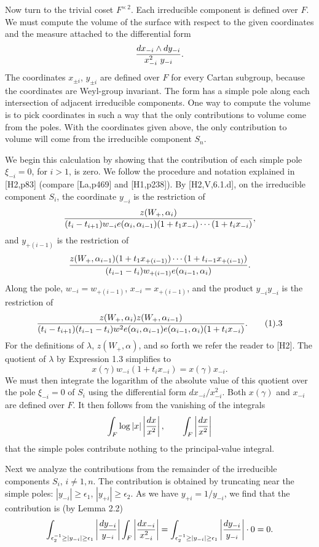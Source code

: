 Now turn to the trivial coset $F^{\times\,2}$.  Each
irreducible component is defined over $F$.
We must compute the volume of the surface with respect to
the given coordinates and the measure attached to the differential form
$${d x_{-i} \wedge dy_{-i}\over x_{-i}^2 \,\,y_{-i}}.$$
The coordinates $x_{\pm i}$, $y_{\pm i}$
are defined over $F$
for every Cartan subgroup, because the 
coordinates are Weyl-group invariant.
The form has a simple pole along each intersection of adjacent
irreducible components. 
One way to compute
the volume is to pick coordinates in such a way that the
only contributions to volume come from the poles.  With
the coordinates given above, the only contribution to
volume will come from the irreducible component $S_n$.

We begin this calculation by showing that the contribution
of each simple pole $\xi_{-i}=0$, for $i>1$,  is zero.  We follow
the procedure and notation explained in [H2,p83] (compare
[La,p469] and [H1,p238]).  
By [H2,V,6.1.d], on the irreducible component $S_i$,
the coordinate
$y_{-i}$ is the restriction of
$${z(W_+,\alpha_i)\over (t_i-t_{i+1}) w_{-i} e(\alpha_i,\alpha_{i-1})(1+t_1 x_{-i})
\cdots (1+t_i x_{-i} )},$$
and $y_{+(i-1)}$ is the restriction of
$${z(W_+,\alpha_{i-1}) (1+t_1 x_{+(i-1)})\cdots (1+t_{i-1} x_{+(i-1)})\over
(t_{i-1}-t_i) w_{+(i-1)} e(\alpha_{i-1},\alpha_i)}.$$
Along the pole, $w_{-i}=w_{+(i-1)}$, $x_{-i} = x_{+(i-1)}$, 
and the product $y_{-i}y_{-i}$ is the restriction
of $${z(W_+,\alpha_i)z(W_+,\alpha_{i-1})\over
(t_i-t_{i+1})(t_{i-1}-t_i) w^2 e(\alpha_i,\alpha_{i-1})e(\alpha_{i-1},\alpha_i)
(1+t_i x_{-i})}.\tag1.3$$
For the definitions of $\lambda$, $z(W_+,\alpha)$, and so forth
we refer the reader to [H2].
The quotient of $\lambda$ by Expression 1.3 simplifies to
$$ x(\gamma)w_{-i}(1+t_i x_{-i} ) = x(\gamma) x_{-i}.$$
We must then integrate the logarithm of the absolute value 
of this quotient 
over the pole $\xi_{-i}=0$ of $S_i$ using the differential
form $d x_{-i}/x_{-i}^2$. Both $x(\gamma)$ and
$x_{-i}$ are defined over $F$.  It then follows from the
vanishing of the integrals
$$\int_F \log|x| \left | {dx\over x^2}\right|,\qquad
  \int_F \left| {dx\over x^2}\right |$$
that the simple poles contribute nothing to the principal-value
integral.

Next we analyze the contributions from the remainder of the
irreducible components $S_i$, $i\ne 1,n$.  The contribution
is obtained by truncating near the simple poles:
$|y_{-i}|\ge \epsilon_1$, $|y_{+i}|\ge \epsilon_2$.
As we have $y_{+i}=1/y_{-i}$, we find that the contribution
is (by Lemma 2.2)
$$\int_{\epsilon^{-1}_2 \ge |y_{-i}|\ge \epsilon_1}
\left| {dy_{-i}\over y_{-i}}\right |
\int_F \left| { dx_{-i}\over x^2_{-i}}\right| =
\int_{\epsilon^{-1}_2 \ge |y_{-i}|\ge \epsilon_1}
\left| {dy_{-i}\over y_{-i}}\right | \cdot 0 = 0.$$

